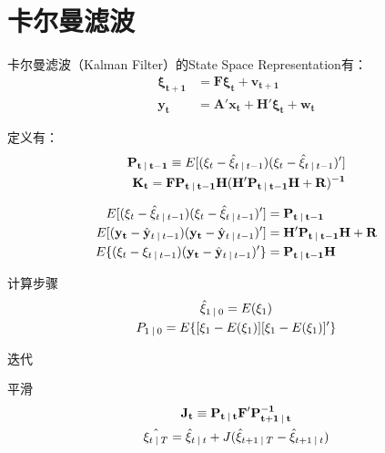 \documentclass[11pt]{article}
\begin{document}
\section{卡尔曼滤波}

卡尔曼滤波（Kalman Filter）的State Space Representation有：
\begin{align*}
   \mathbf{\xi_{t+1}} &= \mathbf{F \xi_{t}} + \mathbf{v_{t+1}} \\
   \mathbf{y_{t}} &= \mathbf{A'} \mathbf{x_{t}} + \mathbf{H'\xi_{t}} + \mathbf{w_t}
\end{align*}

定义有：
\begin{align*}
    \mathbf{P_{t\:\vert\: t-1}} \equiv E[(\xi_{t} - \hat{\xi}_{t\:\vert\: t-1})(\xi_{t} - \hat{\xi}_{t\:\vert\: t-1})'] \\
    \mathbf{K_t} = \mathbf{FP_{t\:\vert\: t-1}H(H'P_{t\:\vert\: t-1}H+R)^{-1}}
\end{align*}

\begin{align*}
    E[(\xi_{t} - \hat{\xi}_{t\:\vert\: t-1})(\xi_{t} - \hat{\xi}_{t\:\vert\: t-1})'] &= \mathbf{P_{t\:\vert\: t-1}} \\ E[(\mathbf{y_t} - \hat{\mathbf{y}}_{t\:\vert\: t-1})(\mathbf{y_t} - \hat{\mathbf{y}}_{t\:\vert\: t-1})'] &= \mathbf{H'P_{t\:\vert\: t-1}H+R} \\
    E\{(\xi_t - \xi_{t\:\vert\: t-1})(\mathbf{y_t} - \hat{\mathbf{y}}_{t\:\vert\: t-1})'\} &= \mathbf{P_{t\:\vert\: t-1}H} \\
\end{align*}

计算步骤
\begin{gather*}
    \hat{\xi}_{1\:\vert\: 0} = E(\xi_1) \\
    P_{1\:\vert\: 0} = E\{[\xi_1 - E(\xi_1)][\xi_1 - E(\xi_1)]'\}
\end{gather*}

迭代

平滑
\begin{gather*}
    \mathbf{J_t} \equiv \mathbf{P_{t\:\vert\: t}F'P^{-1}_{t+1\:\vert\: t}} \\
    \hat{\mathbf{\xi}_{t\:\vert\: T}} = \hat{\mathbf{\xi}}_{t\:\vert\: t} + J(\hat{\xi}_{t+1\:\vert\: T} - \hat{\xi}_{t+1\:\vert\: t})
\end{gather*}
\end{document}
